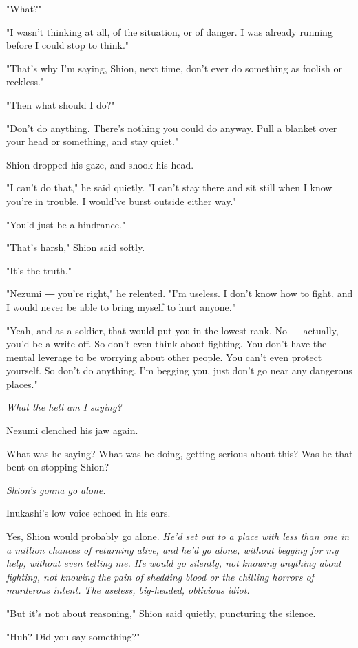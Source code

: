 "What?"

"I wasn't thinking at all, of the situation, or of danger. I was already
running before I could stop to think."

"That's why I'm saying, Shion, next time, don't ever do something as
foolish or reckless."

"Then what should I do?"

"Don't do anything. There's nothing you could do anyway. Pull a blanket
over your head or something, and stay quiet."

Shion dropped his gaze, and shook his head.

"I can't do that," he said quietly. "I can't stay there and sit still
when I know you're in trouble. I would've burst outside either way."

"You'd just be a hindrance."

"That's harsh," Shion said softly.

"It's the truth."

"Nezumi ― you're right," he relented. "I'm useless. I don't know how to
fight, and I would never be able to bring myself to hurt anyone."

"Yeah, and as a soldier, that would put you in the lowest rank. No ―
actually, you'd be a write-off. So don't even think about fighting. You
don't have the mental leverage to be worrying about other people. You
can't even protect yourself. So don't do anything. I'm begging you, just
don't go near any dangerous places."

\emph{What the hell am I saying?}

Nezumi clenched his jaw again.

What was he saying? What was he doing, getting serious about this? Was
he that bent on stopping Shion?

\emph{Shion's gonna go alone.}

Inukashi's low voice echoed in his ears.

Yes, Shion would probably go alone. \emph{He'd set out to a place with less
than one in a million chances of returning alive, and he'd go alone,
without begging for my help, without even telling me. He would go
silently, not knowing anything about fighting, not knowing the pain of
shedding blood or the chilling horrors of murderous intent. The useless,
big-headed, oblivious idiot.}

"But it's not about reasoning," Shion said quietly, puncturing the
silence.

"Huh? Did you say something?"

